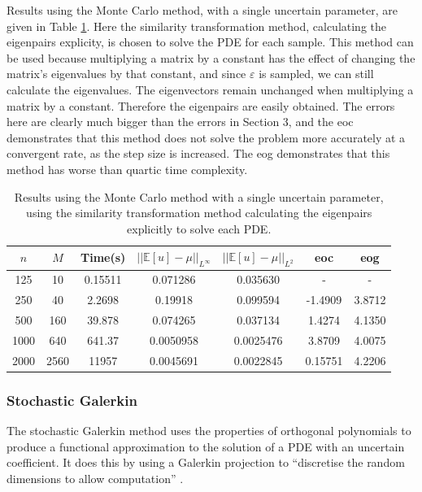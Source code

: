 \documentclass[11pt]{article}
\numberwithin{equation}{section}
\begin{document}
Results using the Monte Carlo method, with a single uncertain parameter, are given in Table \ref{table:monte carlo}. Here the similarity transformation method, calculating the eigenpairs explicity, is chosen to solve the PDE for each sample. This method can be used because multiplying a matrix by a constant has the effect of changing the matrix's eigenvalues by that constant, and since $\varepsilon$ is sampled, we can still calculate the eigenvalues. The eigenvectors remain unchanged when multiplying a matrix by a constant. Therefore the eigenpairs are easily obtained. The errors here are clearly much bigger than the errors in Section 3, and the eoc demonstrates that this method does not solve the problem more accurately at a convergent rate, as the step size is increased. The eog demonstrates that this method has worse than quartic time complexity.
\begin{table}[H]
\centering
\begin{tabular}{|c|c|c|c|c|c|c|}
\hline
$n$ & $M$ & Time(s) & $|| \mathbb{E}[u] - \mu ||_{L^{\infty}}$ & $|| \mathbb{E}[u] - \mu ||_{L^{2}}$ & eoc & eog \\
\hline
125 & 10 & 0.15511 & 0.071286 & 0.035630 & - & - \\
250 & 40 & 2.2698 & 0.19918 & 0.099594 & -1.4909 & 3.8712 \\
500 & 160 & 39.878 & 0.074265 & 0.037134 & 1.4274 & 4.1350 \\
1000 & 640 & 641.37 & 0.0050958 & 0.0025476 & 3.8709 & 4.0075 \\
2000 & 2560 & 11957 & 0.0045691 & 0.0022845 & 0.15751 & 4.2206 \\
\hline
\end{tabular}
\captionsetup{justification=centering}
\caption{Results using the Monte Carlo method with a single uncertain parameter, using the similarity transformation method calculating the eigenpairs explicitly to solve each PDE.}
\label{table:monte carlo}
\end{table}


\subsubsection{Stochastic Galerkin}
The stochastic Galerkin method uses the properties of orthogonal polynomials to produce a functional approximation to the solution of a PDE with an uncertain coefficient. It does this by using a Galerkin projection to ``discretise the random dimensions to allow computation'' \cite{Paul}. 
\end{document}
